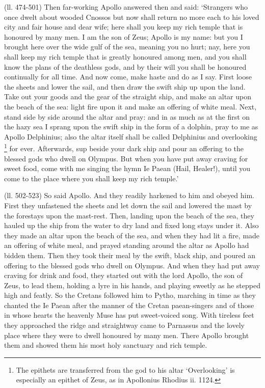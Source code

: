 (ll. 474-501) Then far-working Apollo answered then and said: ‘Strangers
who once dwelt about wooded Cnossos but now shall return no more each to his
loved city and fair house and dear wife; here shall you keep my rich temple
that is honoured by many men. I am the son of Zeus; Apollo is my name: but you
I brought here over the wide gulf of the sea, meaning you no hurt; nay, here
you shall keep my rich temple that is greatly honoured among men, and you shall
know the plans of the deathless gods, and by their will you shall be honoured
continually for all time. And now come, make haste and do as I say. First loose
the sheets and lower the sail, and then draw the swift ship up upon the land.
Take out your goods and the gear of the straight ship, and make an altar upon
the beach of the sea: light fire upon it and make an offering of white meal.
Next, stand side by side around the altar and pray: and in as much as at the
first on the hazy sea I sprang upon the swift ship in the form of a dolphin,
pray to me as Apollo Delphinius; also the altar itself shall be called
Delphinius and overlooking \footnote{The epithets are
transferred from the god to his altar ‘Overlooking’ is especially
an epithet of Zeus, as in Apollonius Rhodius ii. 1124.} for ever. Afterwards, sup beside
your dark ship and pour an offering to the blessed gods who dwell on Olympus.
But when you have put away craving for sweet food, come with me singing the
hymn Ie Paean (Hail, Healer!), until you come to the place where you shall keep
my rich temple.’

(ll. 502-523) So said Apollo. And they readily harkened to him and obeyed him.
First they unfastened the sheets and let down the sail and lowered the mast by
the forestays upon the mast-rest. Then, landing upon the beach of the sea, they
hauled up the ship from the water to dry land and fixed long stays under it.
Also they made an altar upon the beach of the sea, and when they had lit a
fire, made an offering of white meal, and prayed standing around the altar as
Apollo had bidden them. Then they took their meal by the swift, black ship, and
poured an offering to the blessed gods who dwell on Olympus. And when they had
put away craving for drink and food, they started out with the lord Apollo, the
son of Zeus, to lead them, holding a lyre in his hands, and playing sweetly as
he stepped high and featly. So the Cretans followed him to Pytho, marching in
time as they chanted the Ie Paean after the manner of the Cretan paean-singers
and of those in whose hearts the heavenly Muse has put sweet-voiced song. With
tireless feet they approached the ridge and straightway came to Parnassus and
the lovely place where they were to dwell honoured by many men. There Apollo
brought them and showed them his most holy sanctuary and rich temple.

